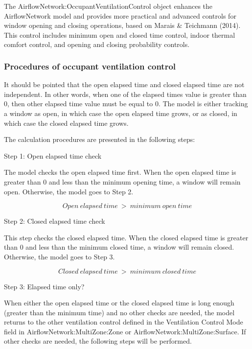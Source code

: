 The AirflowNetwork:OccupantVentilationControl object enhances the AirflowNetwork model and provides more practical and advanced controls for window opening and closing operations, based on Marais \& Teichmann (2014). This control includes minimum open and closed time control, indoor thermal comfort control, and opening and closing probability controls.

\subsubsection{Procedures of occupant ventilation control}\label{procedures-of-occupant-ventilation-control}

It should be pointed that the open elapsed time and closed elapsed time are not independent. In other words, when one of the elapsed times value is greater than 0, then other elapsed time value must be equal to 0. The model is either tracking a window as open, in which case the open elapsed time grows, or as closed, in which case the closed elapsed time grows.

The calculation procedures are presented in the following steps:

Step 1: Open elapsed time check

The model checks the open elapsed time first. When the open elapsed time is greater than 0 and less than the minimum opening time, a window will remain open. Otherwise, the model goes to Step 2.

\begin{equation}
Open~elapsed~time~>~minimum~open~time
\end{equation}

Step 2: Closed elapsed time check

This step checks the closed elapsed time. When the closed elapsed time is greater than 0 and less than the minimum closed time, a window will remain closed. Otherwise, the model goes to Step 3.

\begin{equation}
Closed~elapsed~time~>~minimum~closed~time
\end{equation}

Step 3: Elapsed time only?

When either the open elapsed time or the closed elapsed time is long enough (greater than the minimum time) and no other checks are needed, the model returns to the other ventilation control defined in the Ventilation Control Mode field in AirflowNetwork:MultiZone:Zone or AirflowNetwork:MultiZone:Surface. If other checks are needed, the following steps will be performed.

